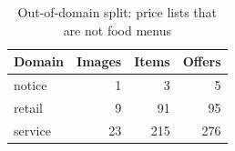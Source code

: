 \begin{table}[t]
\centering
\caption{Out-of-domain split: price lists that are not food menus}
\label{tab:ood}
\small
\begin{tabular}{lrrr}
\toprule
Domain & Images & Items & Offers \\
\midrule
notice & 1 & 3 & 5 \\
retail & 9 & 91 & 95 \\
service & 23 & 215 & 276 \\
\bottomrule
\end{tabular}
\end{table}
